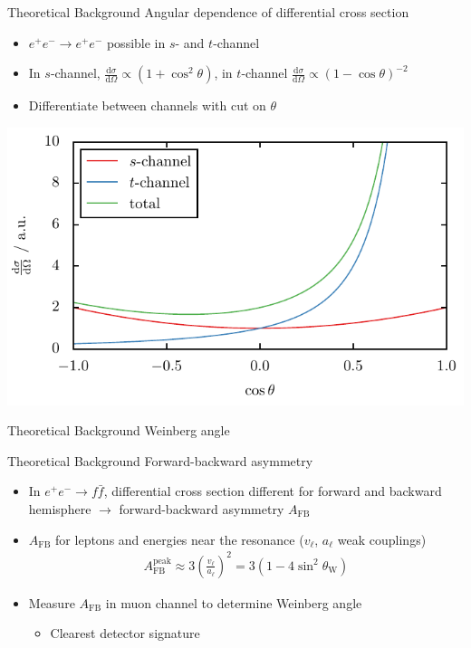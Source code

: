 \documentclass[11pt,xcolor=dvipsnames,professionalfonts]{beamer}
\begin{document}
\begin{frame}{Theoretical Background}
	Angular dependence of differential cross section
	\begin{itemize}
		\item $e^+e^-\rightarrow e^+e^-$ possible in $s$- and $t$-channel
		\item In $s$-channel, $\frac{\mathrm{d}\sigma}{\mathrm{d}\Omega}\propto(1+\cos^2\theta)$, in $t$-channel $\frac{\mathrm{d}\sigma}{\mathrm{d}\Omega}\propto(1-\cos\theta)^{-2}$
		\item Differentiate between channels with cut on $\theta$
	\end{itemize}
	\vspace{.5em}
	\centering
	\includegraphics[width=.7\textwidth]{./talkfigs/pdf/s_t_channel}
\end{frame}

\begin{frame}{Theoretical Background}
	Weinberg angle
\end{frame}

\begin{frame}{Theoretical Background}
	Forward-backward asymmetry
	\begin{itemize}
		\item In $e^+e^- \rightarrow f\bar{f}$, differential cross section different for forward and backward hemisphere $\rightarrow$ forward-backward asymmetry $A_\mathrm{FB}$
		\item $A_\mathrm{FB}$ for leptons and energies near the resonance ($v_\ell$, $a_\ell$ weak couplings)
		\begin{align*}
			A_\mathrm{FB}^{\mathrm{peak}}\approx 3\left(\frac{v_\ell}{a_\ell}\right)^2 = 3\left( 1 - 4 \sin^2\theta_\mathrm{W} \right)
		\end{align*}
		\item Measure $A_\mathrm{FB}$ in muon channel to determine Weinberg angle
		\begin{itemize}
			\item Clearest detector signature
		\end{itemize}
	\end{itemize}
\end{frame}
\end{document}
